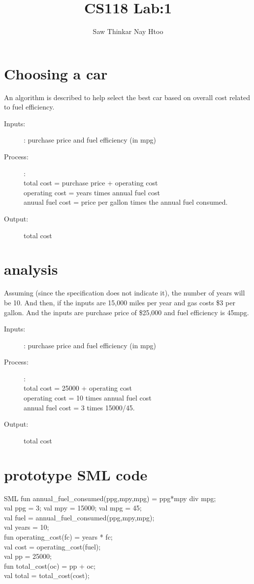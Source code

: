 \documentclass{article}
\begin{document}
\underscoreoff

\title{CS118 Lab:1}
\author{Saw Thinkar Nay Htoo}
\maketitle


\section*{Choosing a car}
An algorithm is described to help select the best car based on overall cost related to fuel efficiency.
\begin{description}
\item[Inputs:] : purchase price and fuel efficiency (in mpg)
\item[Process:] :\\
total cost = purchase price + operating cost \\
operating cost = years times annual fuel cost \\
anuual fuel cost = price per gallon times the annual fuel consumed. 
\item[Output:] total cost
\end{description}
\section*{analysis}
Assuming (since the specification does not indicate it), the number of years will be 10. And then, if the inputs are 15,000 miles per year and gas costs \$3 per gallon. And the inputs are purchase price of \$25,000 and fuel efficiency is 45mpg. 
\begin{description}
\item[Inputs:] : purchase price and fuel efficiency (in mpg)
\item[Process:] :\\
total cost = 25000 + operating cost \\
operating cost = 10 times annual fuel cost \\
annual fuel cost = 3 times 15000/45.
\item[Output:] total cost
\end{description}
\clearpage
\section*{prototype SML code}
\begin{GFT}{SML}
\+fun annual\_fuel\_consumed(ppg,mpy,mpg) = ppg*mpy div mpg;\\
\+val ppg = 3; val mpy = 15000; val mpg = 45;\\
\+val fuel = annual\_fuel\_consumed(ppg,mpy,mpg);\\
\+val years = 10;\\
\+fun operating\_cost(fc) = years * fc;\\
\+val cost = operating\_cost(fuel);\\
\+val pp = 25000;\\
\+fun total\_cost(oc) = pp + oc;\\
\+val total = total\_cost(cost);\\
\end{GFT}
\clearpage
\end{document}
